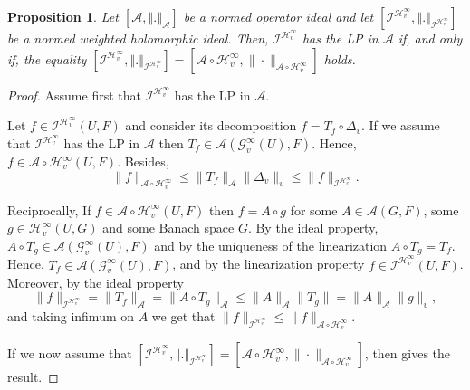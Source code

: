 \documentclass[12pt]{amsart}
\theoremstyle{plain}
\newtheorem{proposition}[theorem]{Proposition}
\numberwithin{equation}{section}
\begin{document}
\begin{proposition}\label{LinPro}
Let $\left[ \mathcal{A},\left\Vert .\right\Vert _{\mathcal{A}}%
\right] $ be a normed operator ideal and let $\left[ \mathcal{I}^{\mathcal{H}%
_{v}^{\infty }},\left\Vert .\right\Vert _{\mathcal{I}^{\mathcal{H}%
_{v}^{\infty }}}\right] $ be a normed weighted holomorphic ideal. Then, $ \mathcal{I}^{\mathcal{H}%
_{v}^{\infty }}$ has the LP in $\mathcal{A}$ if, and only if, the equality  $\left[ \mathcal{I}^{\mathcal{H}%
_{v}^{\infty }},\left\Vert .\right\Vert _{\mathcal{I}^{\mathcal{H}%
_{v}^{\infty }}}\right] =\left[\mathcal{A}\circ \mathcal H_v^\infty, \|\cdot\|_{\mathcal{A}\circ \mathcal H_v^\infty}\right]$ holds.
\end{proposition}

\begin{proof} Assume first that $ \mathcal{I}^{\mathcal{H}%
_{v}^{\infty }}$ has the LP in $\mathcal{A}$.

Let $f\in \mathcal{I}^{\mathcal{H}%
_{v}^{\infty }}(U,F)$ and consider its decomposition $f=T_f\circ \Delta_v$. If we assume that  $ \mathcal{I}^{\mathcal{H}%
_{v}^{\infty }}$ has the LP in $\mathcal{A}$ then $T_f\in \mathcal A(\mathcal G_v^\infty(U),F)$. Hence, $f\in \mathcal A\circ \mathcal H_v^\infty(U,F)$. Besides,
$$
\|f\|_{\mathcal A \circ \mathcal H_v^\infty}\leq \|T_f\|_{\mathcal A}\|\Delta_v\|_v\leq \|f\|_{\mathcal I^{\mathcal H_v^\infty}}.
$$

Reciprocally, If $f \in \mathcal A\circ \mathcal H_v^\infty (U,F)$ then $f=A\circ g$ for some $A\in \mathcal A(G,F)$, some $g\in \mathcal H_v^\infty(U,G)$ and some Banach space $G$. By the ideal property, $A\circ T_g\in \mathcal A(\mathcal G_v^\infty(U),F)$ and by the uniqueness of the linearization $A\circ T_g=T_f$. Hence, $T_f\in \mathcal A(\mathcal G_v^\infty(U),F)$, and by the linearization property $f\in  \mathcal I^{\mathcal H_v^\infty}(U,F)$. Moreover, by the ideal property 
$$
\|f\|_{\mathcal I^{\mathcal H_v^\infty}}=\|T_f\|_{\mathcal A}=\|A\circ T_g\|_{\mathcal A}\leq \|A\|_{\mathcal A}\|T_g\|= \|A\|_{\mathcal A}\|g\|_v,
$$
and taking infimum on $A$ we get that $\|f\|_{\mathcal I^{\mathcal H_v^\infty}}\leq \|f\|_{\mathcal A\circ \mathcal H_v^\infty }$.

If we now assume that $\left[ \mathcal{I}^{\mathcal{H}%
_{v}^{\infty }},\left\Vert .\right\Vert _{\mathcal{I}^{\mathcal{H}%
_{v}^{\infty }}}\right] =\left[\mathcal{A}\circ \mathcal H_v^\infty, \|\cdot\|_{\mathcal{A}\circ \mathcal H_v^\infty}\right]$, then \cite[Theorem 2.7]{CaJiKe} gives the result.
\end{proof}
\end{document}
